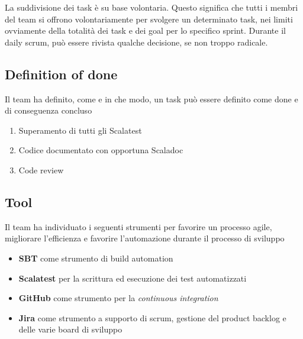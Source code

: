La suddivisione dei task è su base volontaria. Questo significa che tutti i membri del team si offrono volontariamente per svolgere un determinato task, nei limiti ovviamente della totalità dei task e dei goal per lo specifico sprint.
Durante il daily scrum, può essere rivista qualche decisione, se non troppo radicale.

\subsection{Definition of done}

Il team ha definito, come e in che modo, un task può essere definito come done e di conseguenza concluso
\begin{enumerate}
    \item Superamento di tutti gli Scalatest
    \item Codice documentato con opportuna Scaladoc
    \item Code review 
\end{enumerate}

\subsection{Tool}

Il team ha individuato i seguenti strumenti per favorire un processo agile, migliorare l'efficienza e favorire l'automazione durante il processo di sviluppo
\begin{itemize}
    \item \textbf{SBT} come strumento di build automation
    \item \textbf{Scalatest} per la scrittura ed esecuzione dei test automatizzati
    \item \textbf{GitHub} come strumento per la \textit{continuous integration}
    \item \textbf{Jira} come strumento a supporto di scrum, gestione del product backlog e delle varie board di sviluppo
\end{itemize}